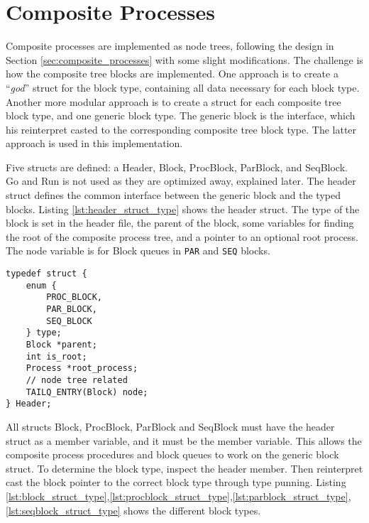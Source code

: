\section{Composite Processes}

Composite processes are implemented as node trees, following the design in Section \ref{sec:composite_processes} with some slight modifications. The challenge is how the composite tree blocks are implemented. One approach is to create a ``\textit{god}'' struct for the block type, containing all data necessary for each block type. Another more modular approach is to create a struct for each composite tree block type, and one generic block type. The generic block is the interface, which his reinterpret casted to the corresponding composite tree block type. The latter approach is used in this implementation.

Five structs are defined: a Header, Block, ProcBlock, ParBlock, and SeqBlock. Go and Run is not used as they are optimized away, explained later. The header struct defines the common interface between the generic block and the typed blocks. Listing \ref{lst:header_struct_type} shows the header struct. The type of the block is set in the header file, the parent of the block, some variables for finding the root of the composite process tree, and a pointer to an optional root process. The node variable is for Block queues in \texttt{PAR} and \texttt{SEQ} blocks.

\begin{lstlisting}[style={CustomC},caption={Header struct type},label={lst:header_struct_type}]
typedef struct {
    enum {
        PROC_BLOCK,
        PAR_BLOCK,
        SEQ_BLOCK
    } type;
    Block *parent;
    int is_root;
    Process *root_process;
    // node tree related
    TAILQ_ENTRY(Block) node;
} Header;
\end{lstlisting}

All structs Block, ProcBlock, ParBlock and SeqBlock must have the header struct as a member variable, and it must be the \underline{} member variable. This allows the composite process procedures and block queues to work on the generic block struct. To determine the block type, inspect the header member. Then reinterpret cast the block pointer to the correct block type through type punning. Listing \ref{lst:block_struct_type},\ref{lst:procblock_struct_type},\ref{lst:parblock_struct_type},\ref{lst:seqblock_struct_type} shows the different block types.

